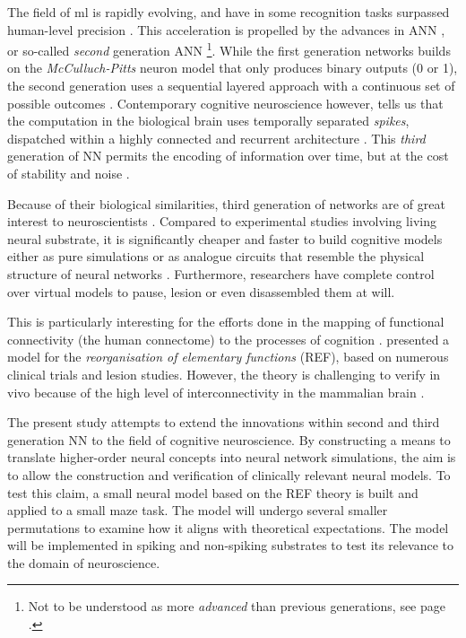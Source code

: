 \documentclass[report.tex]{subfiles}
\begin{document}
The field of \gls{ml} is rapidly evolving, and have in
some recognition tasks surpassed human-level precision
\autocite{Schmidhuber2014}.
This acceleration is propelled by the advances in \gls{ANN}
\autocite{Rumelhart1988, Schmidhuber2014, Nilsson2009}, or
so-called \textit{second} generation \gls{ANN} \cite{Maass1997}\footnote{Not to be 
understood as more \textit{advanced} than previous generations, see page \pageref{sec:glossary}.}.
While the first generation networks builds on the \textit{McCulluch-Pitts}
neuron model that only produces binary outputs (0 or 1), the second
generation uses a sequential layered approach with a continuous set of 
possible outcomes \cite{Maass1997, Russel2007}.
Contemporary cognitive neuroscience however, tells us that the computation
in the biological brain uses temporally separated \textit{spikes}, 
dispatched within a highly connected and recurrent architecture 
\cite{Dayan2001, Eliasmith2004}.
This \textit{third} generation of \gls{NN} permits the encoding
of information over time, but at the cost of stability and 
noise \autocite{Maass1997}.

Because of their biological similarities, third generation of
networks are of great interest to neuroscientists
\autocite{Dayan2001,Bruderle2011,Eliasmith2015}.
Compared to experimental studies involving living neural substrate,
it is significantly cheaper and faster to build  cognitive
models either as pure simulations
\autocite{Davison2009, Eliasmith2015} or as analogue circuits
that resemble the physical structure of neural networks
\autocite{Walter2015, Schmitt2017}.
Furthermore, researchers have complete control over virtual models
to pause, lesion or even disassembled them at will.

This is particularly interesting for the efforts done in the
mapping of functional connectivity (the human connectome) to the
processes of cognition \autocite{Eliasmith2015, Mogensen2011}. 
\textcite{Mogensen2011} presented a model for the 
\textit{reorganisation of elementary functions} (REF), based on
numerous clinical trials and lesion studies.
However, the theory is challenging to verify in vivo because of
the high level of interconnectivity in the mammalian brain
\autocite{Hohwy2009, Mogensen2017}.

The present study attempts to extend the innovations within
second and third generation \gls{NN} to the field of cognitive 
neuroscience. 
By constructing a means to translate higher-order neural
concepts into neural network simulations, the aim is to allow
the construction and verification of clinically relevant neural models.
To test this claim, a small neural model based on the
\gls{REF} theory is built and applied to a small maze task.
The model will undergo several smaller permutations to examine
how it aligns with theoretical expectations.
The model will be implemented in spiking and non-spiking
substrates to test its relevance to the domain of neuroscience.
\end{document}
